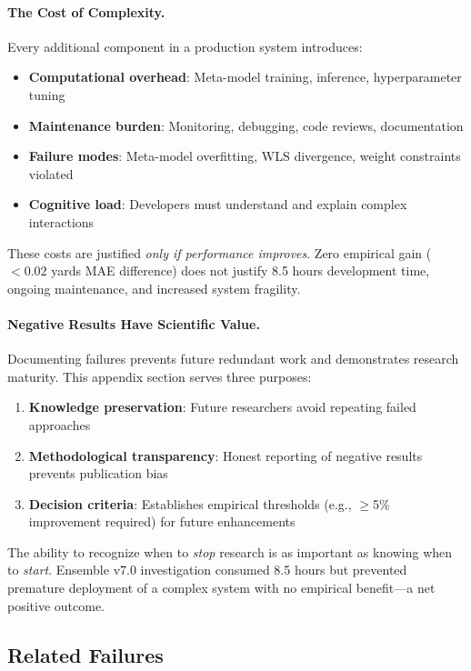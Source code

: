 \paragraph{The Cost of Complexity.}
Every additional component in a production system introduces:
\begin{itemize}
  \item \textbf{Computational overhead}: Meta-model training, inference, hyperparameter tuning
  \item \textbf{Maintenance burden}: Monitoring, debugging, code reviews, documentation
  \item \textbf{Failure modes}: Meta-model overfitting, WLS divergence, weight constraints violated
  \item \textbf{Cognitive load}: Developers must understand and explain complex interactions
\end{itemize}

These costs are justified \textit{only if performance improves}. Zero empirical gain ($<0.02$ yards MAE difference) does not justify 8.5 hours development time, ongoing maintenance, and increased system fragility.

\paragraph{Negative Results Have Scientific Value.}
Documenting failures prevents future redundant work and demonstrates research maturity. This appendix section serves three purposes:
\begin{enumerate}
  \item \textbf{Knowledge preservation}: Future researchers avoid repeating failed approaches
  \item \textbf{Methodological transparency}: Honest reporting of negative results prevents publication bias
  \item \textbf{Decision criteria}: Establishes empirical thresholds (e.g., $\ge$5\% improvement required) for future enhancements
\end{enumerate}

The ability to recognize when to \textit{stop} research is as important as knowing when to \textit{start}. Ensemble v7.0 investigation consumed 8.5 hours but prevented premature deployment of a complex system with no empirical benefit---a net positive outcome.

\subsection{Related Failures}

